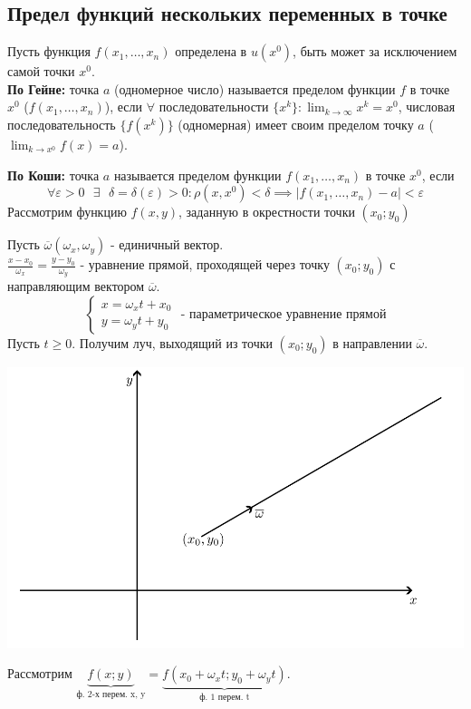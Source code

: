 \documentclass[12pt]{article}
\let\ORIincludegraphics\includegraphics
\renewcommand{\includegraphics}[2][]{\ORIincludegraphics[scale=0.65,#1]{#2}}
\begin{document}
    \subsection{Предел функций нескольких переменных в точке}
    \noindent Пусть функция $f(x_1, \dots, x_n)$ определена в $u(x^0)$, быть может за исключением самой точки $x^0$.\\
    \textbf{По Гейне:} точка $a$ (одномерное число) называется пределом функции $f$ в точке $x^0$ ($f(x_1, \dots, x_n)$), если $\forall$ последовательности $\{x^k\} : \lim_{k\to\infty}x^k=x^0$, числовая последовательность $\{ f(x^k) \}$ (одномерная) имеет своим пределом точку $a$ ($\lim_{k\to x^0}f(x)=a$).\par\noindent
    \textbf{По Коши:} точка $a$ называется пределом функции $f(x_1, \dots, x_n)$ в точке $x^0$, если
    \[ \forall \varepsilon > 0 \text{ } \exists \text{ } \delta = \delta(\varepsilon) > 0 : \rho(x, x^0) < \delta \implies |f(x_1, \dots, x_n) - a| < \varepsilon \]
    Рассмотрим функцию $f(x,y)$, заданную в окрестности точки $(x_0; y_0)$
    \begin{adjustwidth}{1.5em}{1.5em}
        Пусть $\overline{\omega} (\omega_x, \omega_y)$ - единичный вектор.\\
        $\frac{x - x_0}{\omega_x} = \frac{y - y_0}{\omega_y}$ - уравнение прямой, проходящей через точку $(x_0; y_0)$ с направляющим вектором $\overline{\omega}$.
        \[ \begin{cases}
            x = \omega_xt + x_0\\
            y = \omega_yt + y_0
        \end{cases}\text{ - параметрическое уравнение прямой} \]
        Пусть $t \ge 0$. Получим луч, выходящий из точки $(x_0; y_0)$ в направлении $\overline{\omega}$.
        \begin{center}
            \includegraphics{7.2.1.png}
        \end{center}
        Рассмотрим $\underbrace{f(x; y)}_{\text{ф. 2-х перем. x, y}} = \underbrace{f(x_0+\omega_xt; y_0+\omega_yt)}_{\text{ф. 1 перем. t}}$.
    \end{adjustwidth}
\end{document}
